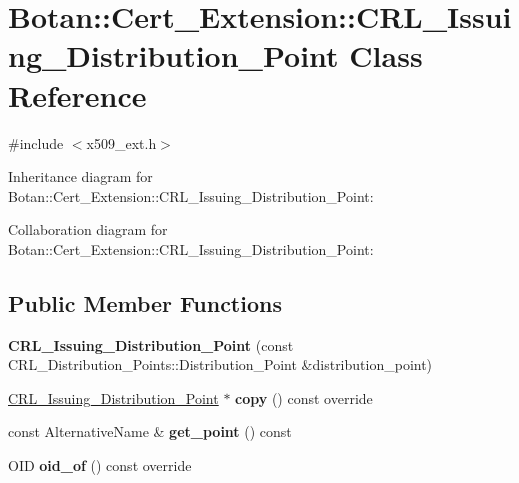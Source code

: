 \hypertarget{class_botan_1_1_cert___extension_1_1_c_r_l___issuing___distribution___point}{}\section{Botan\+:\+:Cert\+\_\+\+Extension\+:\+:C\+R\+L\+\_\+\+Issuing\+\_\+\+Distribution\+\_\+\+Point Class Reference}
\label{class_botan_1_1_cert___extension_1_1_c_r_l___issuing___distribution___point}


{\ttfamily \#include $<$x509\+\_\+ext.\+h$>$}



Inheritance diagram for Botan\+:\+:Cert\+\_\+\+Extension\+:\+:C\+R\+L\+\_\+\+Issuing\+\_\+\+Distribution\+\_\+\+Point\+:


Collaboration diagram for Botan\+:\+:Cert\+\_\+\+Extension\+:\+:C\+R\+L\+\_\+\+Issuing\+\_\+\+Distribution\+\_\+\+Point\+:
\subsection*{Public Member Functions}
\begin{DoxyCompactItemize}
\item 
\mbox{\label{class_botan_1_1_cert___extension_1_1_c_r_l___issuing___distribution___point_aa16a0aef2b4c8682956fce23ff3f4fb0}} 
{\bfseries C\+R\+L\+\_\+\+Issuing\+\_\+\+Distribution\+\_\+\+Point} (const C\+R\+L\+\_\+\+Distribution\+\_\+\+Points\+::\+Distribution\+\_\+\+Point \&distribution\+\_\+point)
\item 
\mbox{\label{class_botan_1_1_cert___extension_1_1_c_r_l___issuing___distribution___point_ae90391b3deda4e6f8b42b143c54d383a}} 
\mbox{\hyperlink{class_botan_1_1_cert___extension_1_1_c_r_l___issuing___distribution___point}{C\+R\+L\+\_\+\+Issuing\+\_\+\+Distribution\+\_\+\+Point}} $\ast$ {\bfseries copy} () const override
\item 
\mbox{\label{class_botan_1_1_cert___extension_1_1_c_r_l___issuing___distribution___point_ab04b8e7583b72d7bbf75163181127ec5}} 
const Alternative\+Name \& {\bfseries get\+\_\+point} () const
\item 
\mbox{\label{class_botan_1_1_cert___extension_1_1_c_r_l___issuing___distribution___point_a31810e32708497aa4f926bf04316f968}} 
O\+ID {\bfseries oid\+\_\+of} () const override
\end{DoxyCompactItemize}
